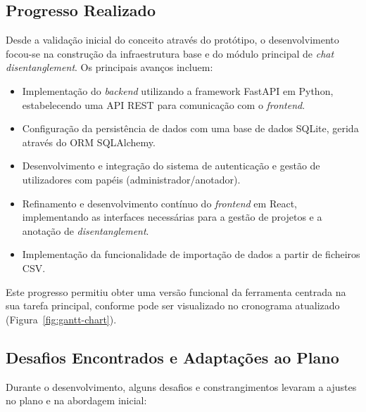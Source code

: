 \subsection{Progresso Realizado}
Desde a validação inicial do conceito através do protótipo, o desenvolvimento focou-se na construção da infraestrutura base e do módulo principal de \textit{chat disentanglement}. Os principais avanços incluem:
\begin{itemize}
    \item Implementação do \textit{backend} utilizando a framework FastAPI em Python, estabelecendo uma API REST para comunicação com o \textit{frontend}.
    \item Configuração da persistência de dados com uma base de dados SQLite, gerida através do ORM SQLAlchemy.
    \item Desenvolvimento e integração do sistema de autenticação e gestão de utilizadores com papéis (administrador/anotador).
    \item Refinamento e desenvolvimento contínuo do \textit{frontend} em React, implementando as interfaces necessárias para a gestão de projetos e a anotação de \textit{disentanglement}.
    \item Implementação da funcionalidade de importação de dados a partir de ficheiros CSV.
\end{itemize}
Este progresso permitiu obter uma versão funcional da ferramenta centrada na sua tarefa principal, conforme pode ser visualizado no cronograma atualizado (Figura~\ref{fig:gantt-chart}).

\subsection{Desafios Encontrados e Adaptações ao Plano}
Durante o desenvolvimento, alguns desafios e constrangimentos levaram a ajustes no plano e na abordagem inicial:

